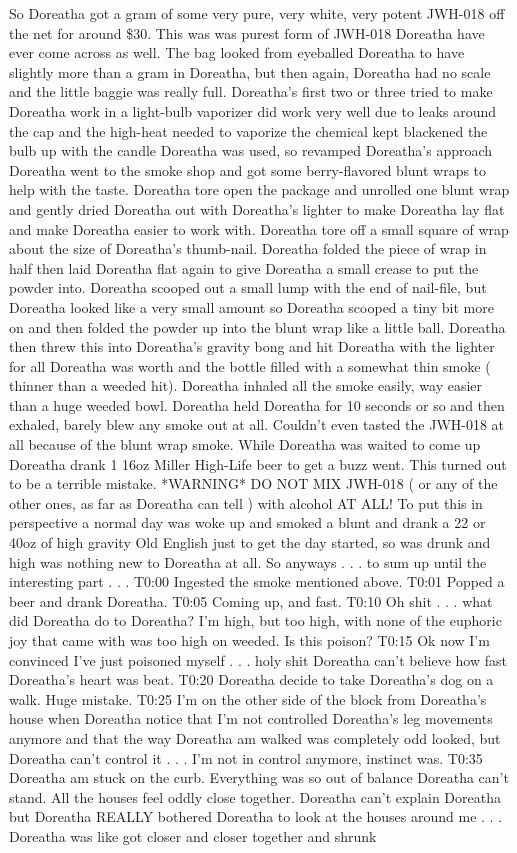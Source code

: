 \documentclass[12pt]{book}
\begin{document}
So Doreatha got a gram of some very pure, very white, very potent JWH-018 off the net for around \$30. This was was purest form of JWH-018 Doreatha have ever come across as well. The bag looked from eyeballed Doreatha to have slightly more than a gram in Doreatha, but then again, Doreatha had no scale and the little baggie was really full. Doreatha's first two or three tried to make Doreatha work in a light-bulb vaporizer did work very well due to leaks around the cap and the high-heat needed to vaporize the chemical kept blackened the bulb up with the candle Doreatha was used, so revamped Doreatha's approach Doreatha went to the smoke shop and got some berry-flavored blunt wraps to help with the taste. Doreatha tore open the package and unrolled one blunt wrap and gently dried Doreatha out with Doreatha's lighter to make Doreatha lay flat and make Doreatha easier to work with. Doreatha tore off a small square of wrap about the size of Doreatha's thumb-nail. Doreatha folded the piece of wrap in half then laid Doreatha flat again to give Doreatha a small crease to put the powder into. Doreatha scooped out a small lump with the end of nail-file, but Doreatha looked like a very small amount so Doreatha scooped a tiny bit more on and then folded the powder up into the blunt wrap like a little ball. Doreatha then threw this into Doreatha's gravity bong and hit Doreatha with the lighter for all Doreatha was worth and the bottle filled with a somewhat thin smoke ( thinner than a weeded hit). Doreatha inhaled all the smoke easily, way easier than a huge weeded bowl. Doreatha held Doreatha for 10 seconds or so and then exhaled, barely blew any smoke out at all. Couldn't even tasted the JWH-018 at all because of the blunt wrap smoke. While Doreatha was waited to come up Doreatha drank 1 16oz Miller High-Life beer to get a buzz went. This turned out to be a terrible mistake. *WARNING* DO NOT MIX JWH-018 ( or any of the other ones, as far as Doreatha can tell ) with alcohol AT ALL! To put this in perspective a normal day was woke up and smoked a blunt and drank a 22 or 40oz of high gravity Old English just to get the day started, so was drunk and high was nothing new to Doreatha at all. So anyways . . .  to sum up until the interesting part . . .  T0:00 Ingested the smoke mentioned above. T0:01 Popped a beer and drank Doreatha. T0:05 Coming up, and fast. T0:10 Oh shit . . .  what did Doreatha do to Doreatha? I'm high, but too high, with none of the euphoric joy that came with was too high on weeded. Is this poison? T0:15 Ok now I'm convinced I've just poisoned myself . . .  holy shit Doreatha can't believe how fast Doreatha's heart was beat. T0:20 Doreatha decide to take Doreatha's dog on a walk. Huge mistake. T0:25 I'm on the other side of the block from Doreatha's house when Doreatha notice that I'm not controlled Doreatha's leg movements anymore and that the way Doreatha am walked was completely odd looked, but Doreatha can't control it . . .  I'm not in control anymore, instinct was. T0:35 Doreatha am stuck on the curb. Everything was so out of balance Doreatha can't stand. All the houses feel oddly close together. Doreatha can't explain Doreatha but Doreatha REALLY bothered Doreatha to look at the houses around me . . .  Doreatha was like got closer and closer together and shrunk 
\end{document}
